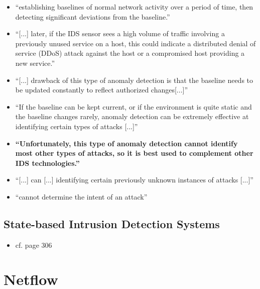		\begin{itemize}
			\item \enquote{establishing baselines of normal network activity over a period of time, then detecting significant deviations from the baseline.} \parencite[p. 203]{Northcutt2005}
			\item \enquote{[...] later, if the IDS sensor sees a high volume of traffic involving a previously unused service on a host, this could indicate a distributed denial of service (DDoS) attack against the host or a compromised host providing a new service.} \parencite{Northcutt2005}
			\item \enquote{[...] drawback of this type of anomaly detection is that the baseline needs to be updated constantly to reflect authorized changes[...]} \parencite{Northcutt2005}
			\item \enquote{If the baseline can be kept current, or if the environment is quite static and the baseline changes rarely, anomaly detection can be extremely effective at identifying certain types of attacks [...]} \parencite{Northcutt2005}
			\item \textbf{\enquote{Unfortunately, this type of anomaly detection cannot identify most other types of attacks, so it is best used to complement other IDS technologies.}} \parencite{Northcutt2005}
			\item \enquote{[...] can [...] identifying certain previously unknown instances of attacks [...]} \parencite{Northcutt2005}
			\item \enquote{cannot determine the intent of an attack} \parencite{Northcutt2005}
			
		\end{itemize}
	
	\subsection{State-based Intrusion Detection Systems}
	\label{sec:background:network:ids:state}
	
	\begin{itemize}
		\item cf. \textcite{Whitman2009} page 306 
	\end{itemize}
	
\section{Netflow}
\label{sec:background:network:netflow}

